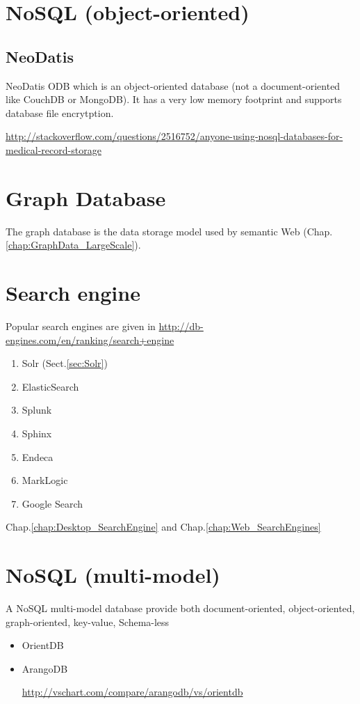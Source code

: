 \section{NoSQL (object-oriented)}
\label{sec:NoSQL_object-oriented}

\subsection{NeoDatis}

NeoDatis ODB which is an object-oriented database (not a document-oriented like
CouchDB or MongoDB). It has a very low memory footprint and supports database file encrytption.

\url{http://stackoverflow.com/questions/2516752/anyone-using-nosql-databases-for-medical-record-storage}

\section{Graph Database}
\label{sec:Graph_database}

The graph database is the data storage model used by semantic Web
(Chap.\ref{chap:GraphData_LargeScale}).


\section{Search engine}
\label{sec:search_engines}

Popular search engines are given in
\url{http://db-engines.com/en/ranking/search+engine}

\begin{enumerate}
  \item Solr (Sect.\ref{sec:Solr})
  \item ElasticSearch
  \item Splunk
  \item Sphinx
  \item Endeca
  \item MarkLogic
  \item Google Search
\end{enumerate}
Chap.\ref{chap:Desktop_SearchEngine} and Chap.\ref{chap:Web_SearchEngines}

\section{NoSQL (multi-model)}

A NoSQL multi-model database provide both document-oriented, object-oriented,
graph-oriented, key-value, Schema-less
\begin{itemize}
  \item OrientDB
  \item ArangoDB

\url{http://vschart.com/compare/arangodb/vs/orientdb}


\end{itemize}



